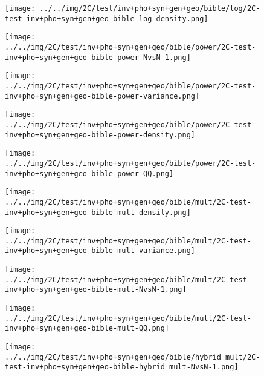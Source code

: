 \begin{figure}[H]
\centering	\texttt{[image: ../../img/2C/test/inv+pho+syn+gen+geo/bible/log/2C-test-inv+pho+syn+gen+geo-bible-log-density.png]}
\end{figure}
\begin{figure}[H]
\centering	\texttt{[image: ../../img/2C/test/inv+pho+syn+gen+geo/bible/power/2C-test-inv+pho+syn+gen+geo-bible-power-NvsN-1.png]}
\end{figure}
\begin{figure}[H]
\centering	\texttt{[image: ../../img/2C/test/inv+pho+syn+gen+geo/bible/power/2C-test-inv+pho+syn+gen+geo-bible-power-variance.png]}
\end{figure}
\begin{figure}[H]
\centering	\texttt{[image: ../../img/2C/test/inv+pho+syn+gen+geo/bible/power/2C-test-inv+pho+syn+gen+geo-bible-power-density.png]}
\end{figure}
\begin{figure}[H]
\centering	\texttt{[image: ../../img/2C/test/inv+pho+syn+gen+geo/bible/power/2C-test-inv+pho+syn+gen+geo-bible-power-QQ.png]}
\end{figure}
\begin{figure}[H]
\centering	\texttt{[image: ../../img/2C/test/inv+pho+syn+gen+geo/bible/mult/2C-test-inv+pho+syn+gen+geo-bible-mult-density.png]}
\end{figure}
\begin{figure}[H]
\centering	\texttt{[image: ../../img/2C/test/inv+pho+syn+gen+geo/bible/mult/2C-test-inv+pho+syn+gen+geo-bible-mult-variance.png]}
\end{figure}
\begin{figure}[H]
\centering	\texttt{[image: ../../img/2C/test/inv+pho+syn+gen+geo/bible/mult/2C-test-inv+pho+syn+gen+geo-bible-mult-NvsN-1.png]}
\end{figure}
\begin{figure}[H]
\centering	\texttt{[image: ../../img/2C/test/inv+pho+syn+gen+geo/bible/mult/2C-test-inv+pho+syn+gen+geo-bible-mult-QQ.png]}
\end{figure}
\begin{figure}[H]
\centering	\texttt{[image: ../../img/2C/test/inv+pho+syn+gen+geo/bible/hybrid\_mult/2C-test-inv+pho+syn+gen+geo-bible-hybrid\_mult-NvsN-1.png]}
\end{figure}
